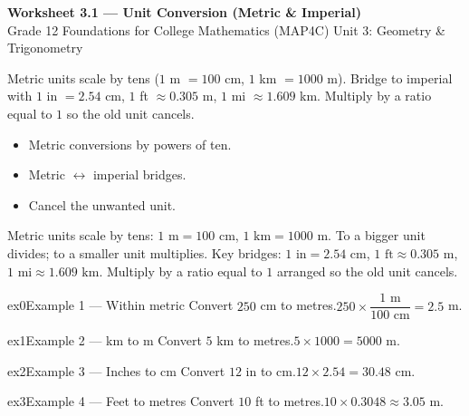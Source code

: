 \documentclass[11pt]{article}
\begin{document}
\begin{center}
{\LARGE\bfseries\color{titleblue}Worksheet 3.1 --- Unit Conversion (Metric \& Imperial)}\\[2pt]
{\small Grade 12 Foundations for College Mathematics (MAP4C) \textperiodcentered{} Unit 3: Geometry \& Trigonometry}
\end{center}

\begin{ideabox}
Metric units scale by tens ($1$ m $=100$ cm, $1$ km $=1000$ m). Bridge to imperial with $1$ in $=2.54$ cm, $1$ ft $\approx0.305$ m, $1$ mi $\approx1.609$ km. Multiply by a ratio equal to $1$ so the old unit cancels.
\begin{itemize}[leftmargin=*,itemsep=2pt]
  \item Metric conversions by powers of ten.
  \item Metric $\leftrightarrow$ imperial bridges.
  \item Cancel the unwanted unit.
\end{itemize}
\end{ideabox}

\begin{learnbox}
Metric units scale by tens: $1\text{ m}=100\text{ cm}$, $1\text{ km}=1000\text{ m}$. To a bigger unit divides; to a smaller unit multiplies.
Key bridges: $1\text{ in}=2.54\text{ cm}$, $1\text{ ft}\approx0.305\text{ m}$, $1\text{ mi}\approx1.609\text{ km}$.
Multiply by a ratio equal to $1$ arranged so the old unit cancels.
\end{learnbox}


\begin{example}{ex0}{Example 1 --- Within metric}
Convert $250$ cm to metres.\soln $250\times\dfrac{1\text{ m}}{100\text{ cm}}=2.5$ m.
\end{example}

\begin{example}{ex1}{Example 2 --- km to m}
Convert $5$ km to metres.\soln $5\times1000=5000$ m.
\end{example}

\begin{example}{ex2}{Example 3 --- Inches to cm}
Convert $12$ in to cm.\soln $12\times2.54=30.48$ cm.
\end{example}

\begin{example}{ex3}{Example 4 --- Feet to metres}
Convert $10$ ft to metres.\soln $10\times0.3048\approx3.05$ m.
\end{example}
\end{document}
